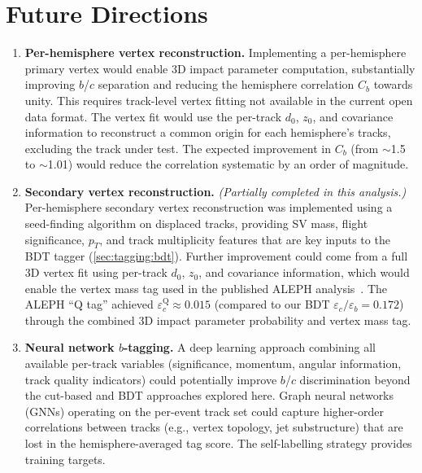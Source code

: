 \documentclass[11pt,a4paper]{article}
\begin{document}
\section{Future Directions}
\label{sec:future}

\begin{enumerate}
\item \textbf{Per-hemisphere vertex reconstruction.}
  Implementing a per-hemisphere primary vertex would enable
  3D impact parameter computation, substantially improving
  $b$/$c$ separation and reducing the hemisphere correlation
  $C_b$ towards unity.
  This requires track-level vertex fitting not available in the
  current open data format.
  The vertex fit would use the per-track $d_0$, $z_0$, and
  covariance information to reconstruct a common origin for
  each hemisphere's tracks, excluding the track under test.
  The expected improvement in $C_b$ (from $\sim$1.5 to $\sim$1.01)
  would reduce the correlation systematic by an order of magnitude.

\item \textbf{Secondary vertex reconstruction.}
  \textit{(Partially completed in this analysis.)}
  Per-hemisphere secondary vertex reconstruction was implemented
  using a seed-finding algorithm on displaced tracks, providing
  SV mass, flight significance, $p_T$, and track multiplicity
  features that are key inputs to the BDT tagger
  (\cref{sec:tagging:bdt}).
  Further improvement could come from a full 3D vertex fit using
  per-track $d_0$, $z_0$, and covariance information, which would
  enable the vertex mass tag used in the published ALEPH
  analysis~\cite{ALEPH:Rb:1996}.
  The ALEPH ``Q tag'' achieved $\varepsilon_c^\text{Q}
  \approx 0.015$ (compared to our BDT
  $\varepsilon_c/\varepsilon_b = 0.172$) through the combined
  3D impact parameter probability and vertex mass tag.

\item \textbf{Neural network $b$-tagging.}
  A deep learning approach combining all available per-track
  variables (significance, momentum, angular information, track
  quality indicators) could potentially improve $b$/$c$
  discrimination beyond the cut-based and BDT approaches explored
  here.
  Graph neural networks (GNNs) operating on the per-event track
  set could capture higher-order correlations between tracks
  (e.g., vertex topology, jet substructure) that are lost in the
  hemisphere-averaged tag score.
  The self-labelling strategy provides training targets.


\end{enumerate}
\end{document}
